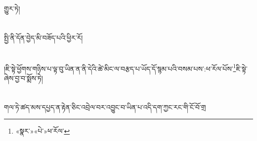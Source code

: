 གྱུར་ཏེ།\chapter{ }སྤྱི་ནི་དོན་བྱེད་མི་བཟོད་པའི་ཕྱིར་རོ།\chapter{ }།ཇི་སྟེ་ཕྱོགས་གཉིས་པ་ལྟ་བུ་ཡིན་ན་ནི་དེའི་ཚེ་མིང་ལ་བརྩད་པ་ཡོད་དོ་སྙམ་པའི་བསམ་པས་:ཕ་རོལ་པོས་\footnote{«སྣར་»«པེ་»ཕ་རོལ་}ཇི་སྟེ་ཞེས་བྱ་བ་སྨོས་ཏེ།\chapter{ }གལ་ཏེ་ཚད་མས་དཔྱད་ན་རྟེན་ཅིང་འབྲེལ་བར་འབྱུང་བ་ཡིན་པ་འདི་དག་ཀྱང་རང་གི་ངོ་བོ་གྲ